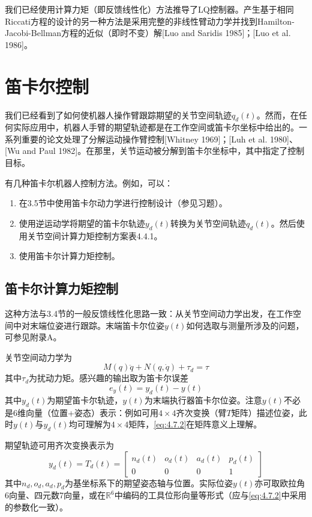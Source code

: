 \documentclass[UTF8]{ctexart}
\theoremstyle{definition}
\begin{document}
我们已经使用计算力矩（即反馈线性化）方法推导了LQ控制器。产生基于相同Riccati方程的设计的另一种方法是采用完整的非线性臂动力学并找到Hamilton-Jacobi-Bellman方程的近似（即时不变）解[Luo and Saridis 1985]；[Luo et al. 1986]。

\section{笛卡尔控制}

我们已经看到了如何使机器人操作臂跟踪期望的关节空间轨迹$q_d(t)$。然而，在任何实际应用中，机器人手臂的期望轨迹都是在工作空间或笛卡尔坐标中给出的。一系列重要的论文处理了分解运动操作臂控制[Whitney 1969]；[Luh et al. 1980]、[Wu and Paul 1982]。在那里，关节运动被分解到笛卡尔坐标中，其中指定了控制目标。

有几种笛卡尔机器人控制方法。例如，可以：
\begin{enumerate}
\item 在3.5节中使用笛卡尔动力学进行控制设计（参见习题）。
\item 使用逆运动学将期望的笛卡尔轨迹$y_d(t)$转换为关节空间轨迹$q_d(t)$。然后使用关节空间计算力矩控制方案表4.4.1。
\item 使用笛卡尔计算力矩控制。
\end{enumerate}

\subsection{笛卡尔计算力矩控制}

这种方法与3.4节的一般反馈线性化思路一致：从关节空间动力学出发，在工作空间中对末端位姿进行跟踪。末端笛卡尔位姿$y(t)$如何选取与测量所涉及的问题，可参见附录A。

关节空间动力学为
\begin{equation}\label{eq:4.7.1}
    M(q)\ddot{q} + N(q, \dot{q}) + \tau_d = \tau
\end{equation}
其中$\tau_d$为扰动力矩。感兴趣的输出取为笛卡尔误差
\begin{equation}\label{eq:4.7.2}
    e_y(t) = y_d(t) - y(t)
\end{equation}
其中$y_d(t)$为期望笛卡尔轨迹，$y(t)$为末端执行器笛卡尔位姿。注意$y(t)$不必是6维向量（位置+姿态）表示：例如可用$4\times 4$齐次变换（臂$T$矩阵）描述位姿，此时$y(t)$与$y_d(t)$均可理解为$4\times 4$矩阵，\eqref{eq:4.7.2}在矩阵意义上理解。

期望轨迹可用齐次变换表示为
\begin{equation}\label{eq:4.7.3}
    y_d(t) = T_d(t) = \begin{bmatrix} n_d(t) & o_d(t) & a_d(t) & p_d(t) \\ 0 & 0 & 0 & 1 \end{bmatrix}
\end{equation}
其中$n_d,o_d,a_d,p_d$为基坐标系下的期望姿态轴与位置。实际位姿$y(t)$亦可取欧拉角6向量、四元数7向量，或在$\mathbb{R}^6$中编码的工具位形向量等形式（应与\eqref{eq:4.7.2}中采用的参数化一致）。
\end{document}
